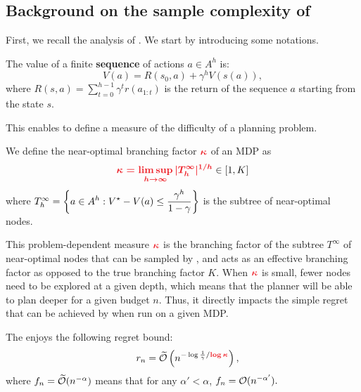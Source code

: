 \documentclass[runningheads]{llncs}
\begin{document}
\subsection{Background on the sample complexity of \OPD}

First, we recall the analysis of \citet{Hren2008optimistic}. We start by introducing some notations.

\begin{definition}
The value of a finite \textbf{sequence} of actions $a\in A^h$ is:
\begin{equation*}
\label{eq:state_value}
    V(a) = R(s_0,a) + \gamma^{h} V(s(a)),
\end{equation*}
where $R(s, a) = \sum_{t=0}^{h-1} \gamma^t r(a_{1:t})$ is the return of the sequence $a$ starting from the state $s$.
\end{definition}

This enables to define a measure of the difficulty of a planning problem.

\begin{definition}
We define the near-optimal branching factor $\hlrb{\kappa}$ of an MDP as
\begin{equation}
\hlrb{\kappa = \limsup_{h\rightarrow\infty} |\hlrb{\Tau_h^\infty}|^{1/h}} \in [1, K]
\end{equation}
where $T^\infty_h = \displaystyle \left\{a\in A^h: V^\star-V(a) \leq \frac{\gamma^h}{1-\gamma}\right\}$ is the subtree of near-optimal nodes.
\end{definition}

This problem-dependent measure $\hlrb{\kappa}$ is the branching factor of the subtree $T^\infty$ of near-optimal nodes that can be sampled by \OPD, and acts as an effective branching factor as opposed to the true branching factor $K$. When $\hlrb{\kappa}$ is small, fewer nodes need to be explored at a given depth, which means that the planner will be able to plan deeper for a given budget $n$. Thus, it directly impacts the simple regret that can be achieved by \OPD when run on a given MDP.


\begin{theorem}
\label{thm:regret-opd}
The  enjoys the following regret bound:
\begin{align*}
\quad r_n = \tilde{\cO}\left( n^{-\log \frac{1}{\gamma}/\hlrb{\log\kappa}}\right),
\end{align*}
where $f_n = \widetilde{\mathcal{O}}(n^{-\alpha})$ means that for any $\alpha'<\alpha$, $f_n = \mathcal{O}(n^{-\alpha'}).$

\end{theorem}
\end{document}
